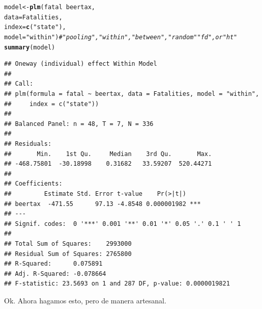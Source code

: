 \documentclass[onesided]{article}\usepackage[]{graphicx}\usepackage[]{color}
\makeatletter
\newcommand{\hlstr}[1]{\textcolor[rgb]{0.192,0.494,0.8}{#1}}%
\newcommand{\hlcom}[1]{\textcolor[rgb]{0.678,0.584,0.686}{\textit{#1}}}%
\newcommand{\hlopt}[1]{\textcolor[rgb]{0,0,0}{#1}}%
\newcommand{\hlstd}[1]{\textcolor[rgb]{0.345,0.345,0.345}{#1}}%
\newcommand{\hlkwb}[1]{\textcolor[rgb]{0.69,0.353,0.396}{#1}}%
\newcommand{\hlkwc}[1]{\textcolor[rgb]{0.333,0.667,0.333}{#1}}%
\newcommand{\hlkwd}[1]{\textcolor[rgb]{0.737,0.353,0.396}{\textbf{#1}}}%
\newenvironment{kframe}{%
 \def\at@end@of@kframe{}%
 \ifinner\ifhmode%
  \def\at@end@of@kframe{\end{minipage}}%
  \begin{minipage}{\columnwidth}%
 \fi\fi%
 \def\FrameCommand##1{\hskip\@totalleftmargin \hskip-\fboxsep
 \colorbox{shadecolor}{##1}\hskip-\fboxsep
     \hskip-\linewidth \hskip-\@totalleftmargin \hskip\columnwidth}%
 \MakeFramed {\advance\hsize-\width
   \@totalleftmargin\z@ \linewidth\hsize
   \@setminipage}}%
 {\par\unskip\endMakeFramed%
 \at@end@of@kframe}
\newenvironment{knitrout}{}{} %
\makeatother
\begin{document}
\begin{knitrout}
\color{fgcolor}\begin{kframe}
\begin{alltt}
\hlstd{model} \hlkwb{<-} \hlkwd{plm}\hlstd{(fatal} \hlopt{~} \hlstd{beertax,}
                    \hlkwc{data} \hlstd{= Fatalities,}
                    \hlkwc{index} \hlstd{=} \hlkwd{c}\hlstd{(}\hlstr{"state"}\hlstd{),}
                    \hlkwc{model} \hlstd{=} \hlstr{"within"}\hlstd{)} \hlcom{# "pooling", "within", "between", "random" "fd", or "ht"}
\hlkwd{summary}\hlstd{(model)}
\end{alltt}
\begin{verbatim}
## Oneway (individual) effect Within Model
## 
## Call:
## plm(formula = fatal ~ beertax, data = Fatalities, model = "within", 
##     index = c("state"))
## 
## Balanced Panel: n = 48, T = 7, N = 336
## 
## Residuals:
##       Min.    1st Qu.     Median    3rd Qu.       Max. 
## -468.75801  -30.18998    0.31682   33.59207  520.44271 
## 
## Coefficients:
##         Estimate Std. Error t-value    Pr(>|t|)    
## beertax  -471.55      97.13 -4.8548 0.000001982 ***
## ---
## Signif. codes:  0 '***' 0.001 '**' 0.01 '*' 0.05 '.' 0.1 ' ' 1
## 
## Total Sum of Squares:    2993000
## Residual Sum of Squares: 2765800
## R-Squared:      0.075891
## Adj. R-Squared: -0.078664
## F-statistic: 23.5693 on 1 and 287 DF, p-value: 0.0000019821
\end{verbatim}
\end{kframe}
\end{knitrout}

Ok. Ahora hagamos esto, pero de manera artesanal.
\end{document}

